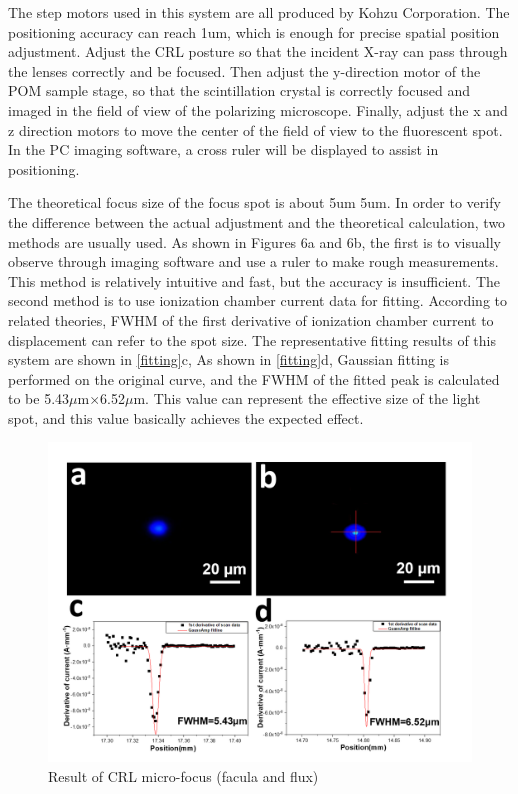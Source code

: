 \documentclass{Head}
\begin{document}
The step motors used in this system are all produced by Kohzu Corporation.
The positioning accuracy can reach 1um, which is enough for precise spatial position adjustment.
Adjust the CRL posture so that the incident X-ray can pass through the lenses correctly and be focused.
Then adjust the y-direction motor of the POM sample stage, so that the scintillation crystal is correctly focused and imaged in the field of view of the polarizing microscope.
Finally, adjust the x and z direction motors to move the center of the field of view to the fluorescent spot.
In the PC imaging software, a cross ruler will be displayed to assist in positioning.



The theoretical focus size of the focus spot is about 5um 5um.
In order to verify the difference between the actual adjustment and the theoretical calculation, two methods are usually used.
As shown in Figures 6a and 6b, the first is to visually observe through imaging software and use a ruler to make rough measurements.
This method is relatively intuitive and fast, but the accuracy is insufficient.
The second method is to use ionization chamber current data for fitting.
According to related theories, FWHM of the first derivative of ionization chamber current to displacement can refer to the spot size.
The representative fitting results of this system are shown in \autoref{fitting}c, As shown in \autoref{fitting}d, Gaussian fitting is performed on the original curve, and the FWHM of the fitted peak is calculated to be 5.43$\mu$m$\times$6.52$\mu$m.
This value can represent the effective size of the light spot, and this value basically achieves the expected effect.
\begin{figure}
    \centering
    \includegraphics[scale=0.5]{Figures/Fig6CRLmicrofocus.png}
    \caption{Result of CRL micro-focus (facula and flux)}
    \label{fitting}
\end{figure}
\end{document}
